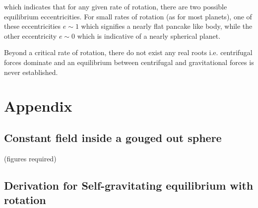 \documentclass[11pt,a4paper]{article}
\newcommand{\1}{\vect{1}}
\begin{document}
which indicates that for any given rate of rotation, there are two possible equilibrium eccentricities. For small rates of rotation (as for most planets), one of these eccentricities $e \sim 1$ which signifies a nearly flat pancake like body, while the other eccentricity $e \sim 0$ which is indicative of a nearly spherical planet.

Beyond a critical rate of rotation, there do not exist any real roots i.e. centrifugal forces dominate and an equilibrium between centrifugal and gravitational forces is never established.

\section{Appendix}

\subsection{Constant field inside a gouged out sphere}
(figures required)

\subsection{Derivation for Self-gravitating equilibrium with rotation}
\end{document}
